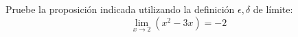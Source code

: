 \item Pruebe la proposición indicada utilizando la definición $\epsilon, \delta$ de límite:
$$\lim_{x \to 2} (x^2 - 3x) = -2$$
